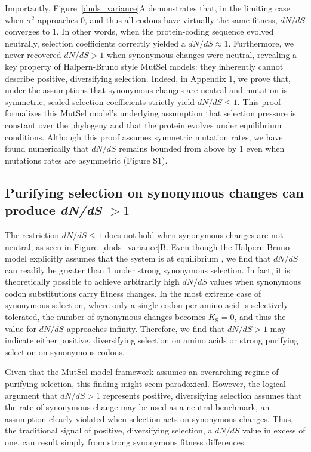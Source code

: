 \documentclass[11pt]{article}
\begin{document}
Importantly, Figure~\ref{dnds_variance}A demonstrates that, in the limiting case when $\sigma^2$ approaches 0, and thus all codons have virtually the same fitness, $dN/dS$ converges to 1. In other words, when the protein-coding sequence evolved neutrally, selection coefficients correctly yielded a $dN/dS \approx 1$. Furthermore, we never recovered $dN/dS > 1$ when synonymous changes were neutral, revealing a key property of Halpern-Bruno style MutSel models: they inherently cannot describe positive, diversifying selection. Indeed, in Appendix 1, we prove that, under the assumptions that synonymous changes are neutral and mutation is symmetric, scaled selection coefficients strictly yield $dN/dS \leq 1$. This proof formalizes this MutSel model's underlying assumption that selection pressure is constant over the phylogeny and that the protein evolves under equilibrium conditions. Although this proof assumes symmetric mutation rates, we have found numerically that $dN/dS$ remains bounded from above by 1 even when mutations rates are asymmetric (Figure S1). 


\subsection*{Purifying selection on synonymous changes can produce \emph{dN/dS} $>1$}

The restriction $dN/dS \leq 1$ does not hold when synonymous changes are not neutral, as seen in Figure~\ref{dnds_variance}B. Even though the Halpern-Bruno model explicitly assumes that the system is at equilibrium \citep{HalpernBruno1998,Thorne2012}, we find that $dN/dS$ can readily be greater than 1 under strong synonymous selection. In fact, it is theoretically possible to achieve arbitrarily high $dN/dS$ values when synonymous codon substitutions carry fitness changes. In the most extreme case of synonymous selection, where only a single codon per amino acid is selectively tolerated, the number of synonymous changes becomes $K_\text{S} = 0$, and thus the value for $dN/dS$ approaches infinity. Therefore, we find that $dN/dS > 1$ may indicate either positive, diversifying selection on amino acids or strong purifying selection on synonymous codons.

Given that the MutSel model framework assumes an overarching regime of purifying selection, this finding might seem paradoxical. However, the logical argument that $dN/dS > 1$ represents positive, diversifying selection assumes that the rate of synonymous change may be used as a neutral benchmark, an assumption clearly violated when selection acts on synonymous changes. Thus, the traditional signal of positive, diversifying selection, a $dN/dS$ value in excess of one, can result simply from strong synonymous fitness differences.
\end{document}
